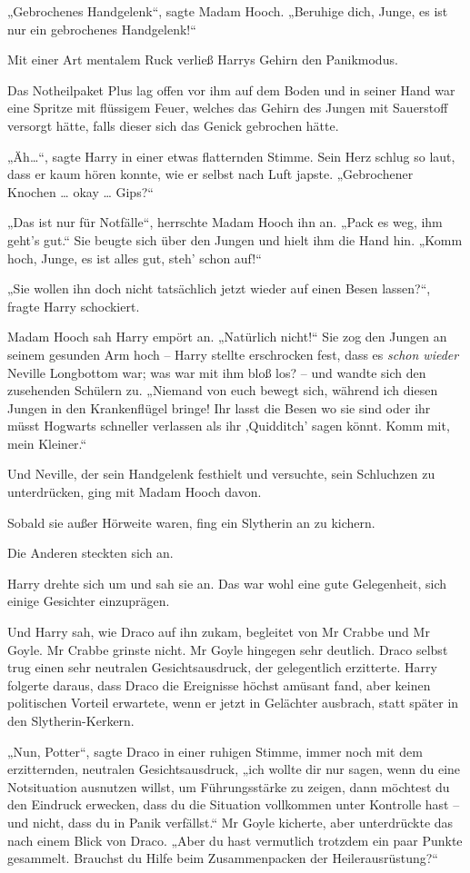 {„Gebrochenes Handgelenk“, sagte Madam Hooch. „Beruhige dich, Junge, es ist nur ein gebrochenes Handgelenk!“

Mit einer Art mentalem Ruck verließ Harrys Gehirn den Panikmodus.

Das Notheilpaket Plus lag offen vor ihm auf dem Boden und in seiner Hand war eine Spritze mit flüssigem Feuer, welches das Gehirn des Jungen mit Sauerstoff versorgt hätte, falls dieser sich das Genick gebrochen hätte.

„Äh…“, sagte Harry in einer etwas flatternden Stimme. Sein Herz schlug so laut, dass er kaum hören konnte, wie er selbst nach Luft japste. „Gebrochener Knochen … okay … Gips?“

„Das ist nur für Notfälle“, herrschte Madam Hooch ihn an. „Pack es weg, ihm geht's gut.“ Sie beugte sich über den Jungen und hielt ihm die Hand hin. „Komm hoch, Junge, es ist alles gut, steh' schon auf!“

„Sie wollen ihn doch nicht tatsächlich jetzt wieder auf einen Besen lassen?“, fragte Harry schockiert.

Madam Hooch sah Harry empört an. „Natürlich nicht!“ Sie zog den Jungen an seinem gesunden Arm hoch -- Harry stellte erschrocken fest, dass es \emph{schon wieder} Neville Longbottom war; was war mit ihm bloß los? -- und wandte sich den zusehenden Schülern zu. „Niemand von euch bewegt sich, während ich diesen Jungen in den Krankenflügel bringe! Ihr lasst die Besen wo sie sind oder ihr müsst Hogwarts schneller verlassen als ihr ‚Quidditch' sagen könnt. Komm mit, mein Kleiner.“

Und Neville, der sein Handgelenk festhielt und versuchte, sein Schluchzen zu unterdrücken, ging mit Madam Hooch davon.

Sobald sie außer Hörweite waren, fing ein Slytherin an zu kichern.

Die Anderen steckten sich an.

Harry drehte sich um und sah sie an. Das war wohl eine gute Gelegenheit, sich einige Gesichter einzuprägen.

Und Harry sah, wie Draco auf ihn zukam, begleitet von Mr Crabbe und Mr Goyle. Mr Crabbe grinste nicht. Mr Goyle hingegen sehr deutlich. Draco selbst trug einen sehr neutralen Gesichtsausdruck, der gelegentlich erzitterte. Harry folgerte daraus, dass Draco die Ereignisse höchst amüsant fand, aber keinen politischen Vorteil erwartete, wenn er jetzt in Gelächter ausbrach, statt später in den Slytherin-Kerkern.

„Nun, Potter“, sagte Draco in einer ruhigen Stimme, immer noch mit dem erzitternden, neutralen Gesichtsausdruck, „ich wollte dir nur sagen, wenn du eine Notsituation ausnutzen willst, um Führungsstärke zu zeigen, dann möchtest du den Eindruck erwecken, dass du die Situation vollkommen unter Kontrolle hast -- und nicht, dass du in Panik verfällst.“ Mr Goyle kicherte, aber unterdrückte das nach einem Blick von Draco. „Aber du hast vermutlich trotzdem ein paar Punkte gesammelt. Brauchst du Hilfe beim Zusammenpacken der Heilerausrüstung?“

}
